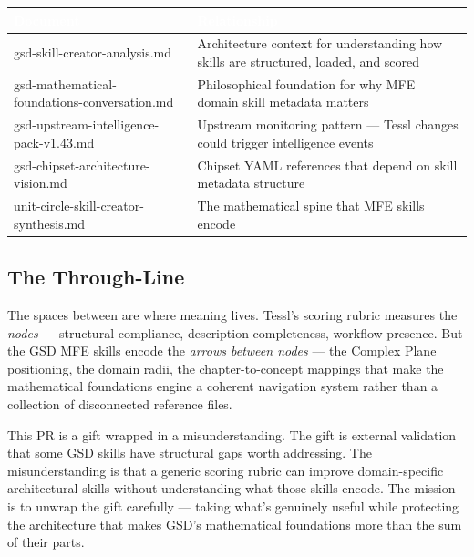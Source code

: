 \documentclass[11pt,letterpaper]{article}
\newcommand{\stageheader}[2]{%
  \noindent\colorbox{#2}{\makebox[\textwidth][l]{%
    \textcolor{white}{\bfseries\sffamily\hspace{6pt}#1\hspace{6pt}}}}%
  \vspace{0.5em}\par%
}
\newcommand{\tableheader}[1]{\textbf{\sffamily\textcolor{white}{#1}}}
\begin{document}
\begin{center}
\begin{tabularx}{\textwidth}{L{4cm}X}
\toprule
{}
\tableheader{Document} & \tableheader{Relationship} \\
\midrule
gsd-skill-creator-analysis.md & Architecture context for understanding how skills are structured, loaded, and scored \\
gsd-mathematical-foundations-conversation.md & Philosophical foundation for why MFE domain skill metadata matters \\
gsd-upstream-intelligence-pack-v1.43.md & Upstream monitoring pattern --- Tessl changes could trigger intelligence events \\
gsd-chipset-architecture-vision.md & Chipset YAML references that depend on skill metadata structure \\
unit-circle-skill-creator-synthesis.md & The mathematical spine that MFE skills encode \\
\bottomrule
\end{tabularx}
\end{center}

\subsection{The Through-Line}

The spaces between are where meaning lives. Tessl's scoring rubric measures the \emph{nodes} --- structural compliance, description completeness, workflow presence. But the GSD MFE skills encode the \emph{arrows between nodes} --- the Complex Plane positioning, the domain radii, the chapter-to-concept mappings that make the mathematical foundations engine a coherent navigation system rather than a collection of disconnected reference files.

This PR is a gift wrapped in a misunderstanding. The gift is external validation that some GSD skills have structural gaps worth addressing. The misunderstanding is that a generic scoring rubric can improve domain-specific architectural skills without understanding what those skills encode. The mission is to unwrap the gift carefully --- taking what's genuinely useful while protecting the architecture that makes GSD's mathematical foundations more than the sum of their parts.

\newpage

\stageheader{STAGE 2 --- RESEARCH REFERENCE}{secondary}
\end{document}
